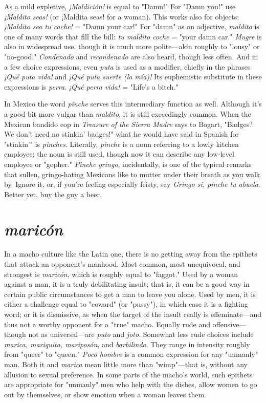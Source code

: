 As a mild expletive, \emph{¡Maldición!} is equal to "Damn!" For
"Damn you!" use \emph{¡Maldito seas!} (or ¡Maldita seas! for a woman). This
works also for objects: \emph{¡Maldito sea tu cache!} = "Damn your car!" For
"damn" as an adjective, \emph{maldito} is one of many words that fill the bill:
\emph{tu maldito coche} = "your damn car." \emph{Mugre} is also in widespread use,
though it is much more polite---akin roughly to "lousy" or "no-good."
\emph{Condenado} and \emph{recondenado} are also heard, though less often. And in
a few choice expressions, even \emph{puta} is used as a modifier, chiefly in the
phrases \emph{¡Qué puta vida!} and \emph{¡Qué puta suerte (la mía)!} Its euphemistic substitute in these expressions is \emph{perra}. \emph{¡Qué perra vida!} = "Life's
a bitch."

In Mexico the word \emph{pinche} serves this intermediary function
as well. Although it's a good bit more vulgar than \emph{maldito}, it is still
exceedingly common. When the Mexican bandido cop in \emph{Treasure of
the Sierra Madre} says to Bogart, "Badges? We don't need no stinkin'
badges!" what he would have said in Spanish for "stinkin'" is \emph{pinches}.
Literally, \emph{pinche} is a noun referring to a lowly kitchen employee; the
noun is still used, though now it can describe any low-level employee
or "gopher." \emph{Pinche gringo}, incidentally, is one of the typical remarks
that sullen, gringo-hating Mexicans like to mutter under their breath
as you walk by. Ignore it, or, if you're feeling especially feisty, say
\emph{Gringo sí, pinche tu abuela}. Better yet, buy the guy a beer.

\section{\emph{maricón}}

In a macho culture like the Latin one, there is no getting away
from the epithets that attack an opponent's manhood. Most common,
most unequivocal, and strongest is \emph{maricón}, which is roughly equal to
"faggot." Used by a woman against a man, it is a truly debilitating insult; that is, it can be a good way in certain public circumstances to get
a man to leave you alone. Used by men, it is either a challenge equal to
"coward" (or "pussy"), in which case it is a fighting word; or it is dismissive, as when the target of the insult really is effeminate---and thus
not a worthy opponent for a "true" macho. Equally rude and offensive---though not as universal---are \emph{puto} and \emph{joto}. Somewhat less rude
choices include \emph{marica, mariquita, mariposón}, and \emph{barbilindo}. They
range in intensity roughly from "queer" to "queen." \emph{Poco hombre} is a
common expression for any "unmanly" man. Both it and \emph{marica} mean
little more than "wimp"---that is, without any allusion to sexual preference. In some parts of the macho's world, such epithets are appropriate for "unmanly" men who help with the dishes, allow women to go
out by themselves, or show emotion when a woman leaves them.

